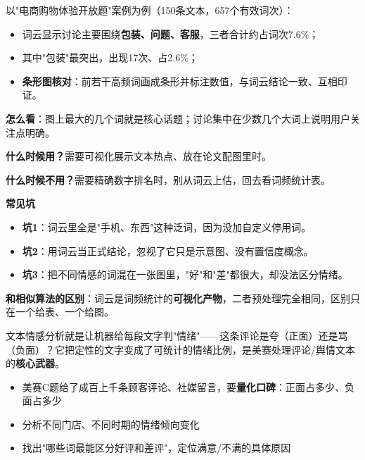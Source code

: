 \begin{algoresult}
以"电商购物体验开放题"案例为例（150条文本，657个有效词次）：

\begin{itemize}
    \item 词云显示讨论主要围绕\textbf{包装、问题、客服}，三者合计约占词次7.6\%；
    \item 其中"包装"最突出，出现17次、占2.6\%；
    \item \textbf{条形图核对}：前若干高频词画成条形并标注数值，与词云结论一致、互相印证。
\end{itemize}

\textbf{怎么看}：图上最大的几个词就是核心话题；讨论集中在少数几个大词上说明用户关注点明确。
\end{algoresult}

\begin{algonotes}
\textbf{什么时候用？}需要可视化展示文本热点、放在论文配图里时。

\textbf{什么时候不用？}需要精确数字排名时，别从词云上估，回去看词频统计表。

\textbf{常见坑}
\begin{itemize}
    \item \textbf{坑1}：词云里全是"手机、东西"这种泛词，因为没加自定义停用词。
    \item \textbf{坑2}：用词云当正式结论，忽视了它只是示意图、没有置信度概念。
    \item \textbf{坑3}：把不同情感的词混在一张图里，"好"和"差"都很大，却没法区分情绪。
\end{itemize}

\textbf{和相似算法的区别}：词云是词频统计的\textbf{可视化产物}，二者预处理完全相同，区别只在一个给表、一个给图。
\end{algonotes}


\begin{algointro}
文本情感分析就是让机器给每段文字判"情绪"——这条评论是夸（正面）还是骂（负面）？它把定性的文字变成了可统计的情绪比例，是美赛处理评论/舆情文本的\textbf{核心武器}。
\end{algointro}

\begin{algoscene}
\begin{itemize}
    \item 美赛C题给了成百上千条顾客评论、社媒留言，要\textbf{量化口碑}：正面占多少、负面占多少
    \item 分析不同门店、不同时期的情绪倾向变化
    \item 找出"哪些词最能区分好评和差评"，定位满意/不满的具体原因
\end{itemize}
\end{algoscene}

